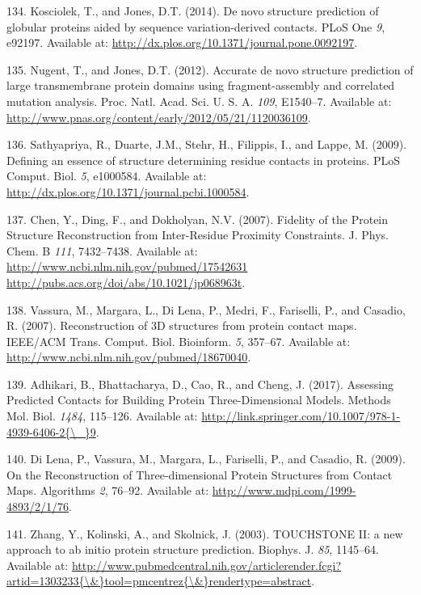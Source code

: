 \documentclass[11pt,a4paper,twoside]{book}
\theoremstyle{definition}
\theoremstyle{definition}
\theoremstyle{remark}
\begin{document}
\hypertarget{ref-Kosciolek2014}{}
134. Kosciolek, T., and Jones, D.T. (2014). De novo structure prediction
of globular proteins aided by sequence variation-derived contacts. PLoS
One \emph{9}, e92197. Available at:
\url{http://dx.plos.org/10.1371/journal.pone.0092197}.

\hypertarget{ref-Nugent2012}{}
135. Nugent, T., and Jones, D.T. (2012). Accurate de novo structure
prediction of large transmembrane protein domains using
fragment-assembly and correlated mutation analysis. Proc. Natl. Acad.
Sci. U. S. A. \emph{109}, E1540--7. Available at:
\url{http://www.pnas.org/content/early/2012/05/21/1120036109}.

\hypertarget{ref-Sathyapriya2009}{}
136. Sathyapriya, R., Duarte, J.M., Stehr, H., Filippis, I., and Lappe,
M. (2009). Defining an essence of structure determining residue contacts
in proteins. PLoS Comput. Biol. \emph{5}, e1000584. Available at:
\url{http://dx.plos.org/10.1371/journal.pcbi.1000584}.

\hypertarget{ref-Chen2007}{}
137. Chen, Y., Ding, F., and Dokholyan, N.V. (2007). Fidelity of the
Protein Structure Reconstruction from Inter-Residue Proximity
Constraints. J. Phys. Chem. B \emph{111}, 7432--7438. Available at:
\href{http://www.ncbi.nlm.nih.gov/pubmed/17542631\%20http://pubs.acs.org/doi/abs/10.1021/jp068963t}{http://www.ncbi.nlm.nih.gov/pubmed/17542631 http://pubs.acs.org/doi/abs/10.1021/jp068963t}.

\hypertarget{ref-Vassura2007}{}
138. Vassura, M., Margara, L., Di Lena, P., Medri, F., Fariselli, P.,
and Casadio, R. (2007). Reconstruction of 3D structures from protein
contact maps. IEEE/ACM Trans. Comput. Biol. Bioinform. \emph{5},
357--67. Available at:
\url{http://www.ncbi.nlm.nih.gov/pubmed/18670040}.

\hypertarget{ref-Adhikari2017}{}
139. Adhikari, B., Bhattacharya, D., Cao, R., and Cheng, J. (2017).
Assessing Predicted Contacts for Building Protein Three-Dimensional
Models. Methods Mol. Biol. \emph{1484}, 115--126. Available at:
\href{http://link.springer.com/10.1007/978-1-4939-6406-2\%7B/_\%7D9}{http://link.springer.com/10.1007/978-1-4939-6406-2\{\textbackslash{}\_\}9}.

\hypertarget{ref-DiLena2009a}{}
140. Di Lena, P., Vassura, M., Margara, L., Fariselli, P., and Casadio,
R. (2009). On the Reconstruction of Three-dimensional Protein Structures
from Contact Maps. Algorithms \emph{2}, 76--92. Available at:
\url{http://www.mdpi.com/1999-4893/2/1/76}.

\hypertarget{ref-Zhang2003}{}
141. Zhang, Y., Kolinski, A., and Skolnick, J. (2003). TOUCHSTONE II: a
new approach to ab initio protein structure prediction. Biophys. J.
\emph{85}, 1145--64. Available at:
\href{http://www.pubmedcentral.nih.gov/articlerender.fcgi?artid=1303233\%7B/\&\%7Dtool=pmcentrez\%7B/\&\%7Drendertype=abstract}{http://www.pubmedcentral.nih.gov/articlerender.fcgi?artid=1303233\{\textbackslash{}\&\}tool=pmcentrez\{\textbackslash{}\&\}rendertype=abstract}.
\end{document}
